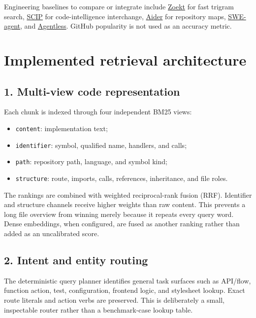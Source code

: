 \documentclass[UTF8,12pt,openany]{ctexbook}
\begin{document}
Engineering baselines to compare or integrate include \href{https://github.com/sourcegraph/zoekt}{Zoekt} for fast trigram search, \href{https://github.com/sourcegraph/scip}{SCIP} for code-intelligence interchange, \href{https://github.com/Aider-AI/aider}{Aider} for repository maps, \href{https://github.com/princeton-nlp/SWE-agent}{SWE-agent}, and \href{https://github.com/OpenAutoCoder/Agentless}{Agentless}. GitHub popularity is not used as an accuracy metric.\par

\section{Implemented retrieval architecture}

\subsection{1. Multi-view code representation}

Each chunk is indexed through four independent BM25 views:\par

\begin{itemize}
\item \texttt{content}: implementation text;
\item \texttt{identifier}: symbol, qualified name, handlers, and calls;
\item \texttt{path}: repository path, language, and symbol kind;
\item \texttt{structure}: route, imports, calls, references, inheritance, and file roles.
\end{itemize}

The rankings are combined with weighted reciprocal-rank fusion (RRF). Identifier and structure channels receive higher weights than raw content. This prevents a long file overview from winning merely because it repeats every query word. Dense embeddings, when configured, are fused as another ranking rather than added as an uncalibrated score.\par

\subsection{2. Intent and entity routing}

The deterministic query planner identifies general task surfaces such as API/flow, function action, test, configuration, frontend logic, and stylesheet lookup. Exact route literals and action verbs are preserved. This is deliberately a small, inspectable router rather than a benchmark-case lookup table.\par
\end{document}
